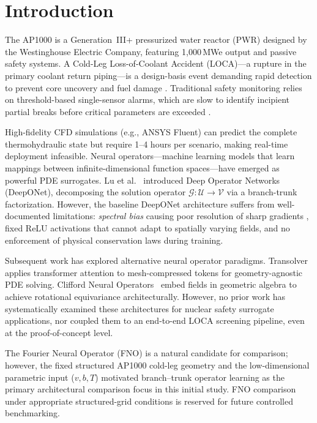 \documentclass[conference]{IEEEtran}
\begin{document}
\section{Introduction}

The AP1000 is a Generation~III+ pressurized water reactor (PWR) designed by the Westinghouse Electric Company, featuring 1,000\,MWe output and passive safety systems. A Cold-Leg Loss-of-Coolant Accident (LOCA)---a rupture in the primary coolant return piping---is a design-basis event demanding rapid detection to prevent core uncovery and fuel damage \cite{wecdcd}. Traditional safety monitoring relies on threshold-based single-sensor alarms, which are slow to identify incipient partial breaks before critical parameters are exceeded \cite{nrc_loca}.

High-fidelity CFD simulations (e.g., ANSYS Fluent) can predict the complete thermohydraulic state but require 1--4 hours per scenario, making real-time deployment infeasible. Neural operators---machine learning models that learn mappings between infinite-dimensional function spaces---have emerged as powerful PDE surrogates. Lu et al.~\cite{lu2021deeponet} introduced Deep Operator Networks (DeepONet), decomposing the solution operator $\mathcal{G}: \mathcal{U} \to \mathcal{V}$ via a branch-trunk factorization. However, the baseline DeepONet architecture suffers from well-documented limitations: \emph{spectral bias} causing poor resolution of sharp gradients \cite{rahaman2019spectral}, fixed ReLU activations that cannot adapt to spatially varying fields, and no enforcement of physical conservation laws during training.

Subsequent work has explored alternative neural operator paradigms. Transolver~\cite{wu2024transolver} applies transformer attention to mesh-compressed tokens for geometry-agnostic PDE solving. Clifford Neural Operators~\cite{brandstetter2023clifford} embed fields in geometric algebra to achieve rotational equivariance architecturally. However, no prior work has systematically examined these architectures for nuclear safety surrogate applications, nor coupled them to an end-to-end LOCA screening pipeline, even at the proof-of-concept level.

The Fourier Neural Operator (FNO) \cite{li2021fno} is a natural candidate for comparison; however, the fixed structured AP1000 cold-leg geometry and the low-dimensional parametric input ($v, b, T$) motivated branch--trunk operator learning as the primary architectural comparison focus in this initial study. FNO comparison under appropriate structured-grid conditions is reserved for future controlled benchmarking.
\end{document}
